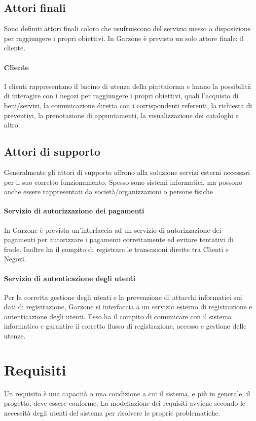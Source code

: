 \subsection{Attori finali}
Sono definiti attori finali coloro che usufruiscono del servizio messo a disposizione per raggiungere i propri obiettivi. In Garzone è previsto un solo attore finale: il cliente.
\paragraph{Cliente}
I clienti rappresentano il bacino di utenza della piattaforma e hanno la possibilità di interagire con i negozi per raggiungere i propri obiettivi, quali l'acquisto di beni/servizi, la comunicazione diretta con i corrispondenti referenti, la richiesta di preventivi, la prenotazione di appuntamenti, la visualizzazione dei cataloghi e altro.
\subsection{Attori di supporto}
Generalmente gli attori di supporto offrono alla soluzione servizi esterni necessari per il suo corretto funzionamento. Spesso sono sistemi informatici, ma possono anche essere rappresentati da società/organizzazioni o persone fisiche
\paragraph{Servizio di autorizzazione dei pagamenti} In Garzone è prevista un'interfaccia ad un servizio di autorizzazione dei pagamenti per autorizzare i pagamenti correttamente ed evitare tentativi di frode. Inoltre ha il compito di registrare le transazioni dirette tra Clienti e Negozi.
\paragraph{Servizio di autenticazione degli utenti} Per la corretta gestione degli utenti e la prevenzione di attacchi informatici sui dati di registrazione, Garzone si interfaccia a un servizio esterno di registrazione e autenticazione degli utenti. Esso ha il compito di comunicare con il sistema informatico e garantire il corretto flusso di registrazione, accesso e gestione delle utenze.
\section{Requisiti}
Un requisito è una capacità o una condizione a cui il sistema, e più in generale, il progetto, deve essere conforme\cite{JBR99}. La modellazione dei requisiti avviene secondo le necessità degli utenti del sistema per risolvere le proprie problematiche.
